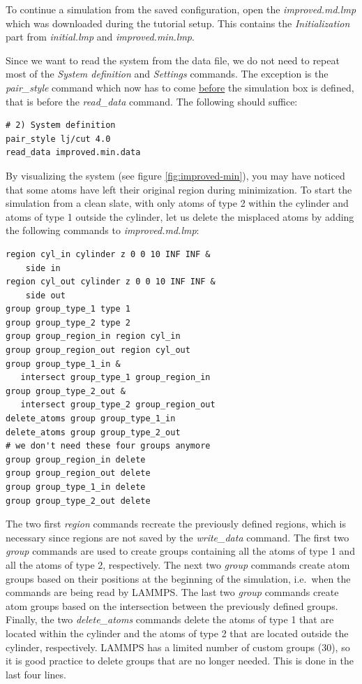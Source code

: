 \documentclass[9pt,tutorial]{livecoms}
\renewcommand{\emph}[1]{\underline{#1}}
\begin{document}
To continue a simulation from the saved configuration, open the
\textit{improved.md.lmp} which was downloaded during the tutorial setup.
This contains the \textit{Initialization} part from \textit{initial.lmp}
and \textit{improved.min.lmp}.

Since we want to read the system from the data file, we do not need
to repeat most of the \textit{System definition} and \textit{Settings}
commands.  The exception is the \textit{pair\_style} command which now
has to come \emph{before} the simulation box is defined, that is before
the \textit{read\_data} command.  The following should suffice:
\begin{lstlisting}
# 2) System definition
pair_style lj/cut 4.0
read_data improved.min.data
\end{lstlisting}

By visualizing the system (see figure \ref{fig:improved-min}), you may
have noticed that some atoms have left their original region during
minimization.  To start the simulation from a clean slate, with only
atoms of type 2 within the cylinder and atoms of type 1 outside the
cylinder, let us delete the misplaced atoms by adding the following
commands to \textit{improved.md.lmp}:

\begin{lstlisting}
region cyl_in cylinder z 0 0 10 INF INF &
    side in
region cyl_out cylinder z 0 0 10 INF INF &
    side out
group group_type_1 type 1
group group_type_2 type 2
group group_region_in region cyl_in
group group_region_out region cyl_out
group group_type_1_in &
   intersect group_type_1 group_region_in
group group_type_2_out &
   intersect group_type_2 group_region_out
delete_atoms group group_type_1_in
delete_atoms group group_type_2_out
# we don't need these four groups anymore
group group_region_in delete
group group_region_out delete
group group_type_1_in delete
group group_type_2_out delete
\end{lstlisting}

The two first \textit{region} commands recreate the previously defined
regions, which is necessary since regions are not saved by the
\textit{write\_data} command.  The first two \textit{group} commands are
used to create groups containing all the atoms of type 1 and all the
atoms of type 2, respectively.  The next two \textit{group} commands
create atom groups based on their positions at the beginning of the
simulation, i.e.~when the commands are being read by LAMMPS.  The last
two \textit{group} commands create atom groups based on the intersection
between the previously defined groups.  Finally, the two
\textit{delete\_atoms} commands delete the atoms of type 1 that are
located within the cylinder and the atoms of type 2 that are located
outside the cylinder, respectively.  LAMMPS has a limited number of
custom groups (30), so it is good practice to delete groups that are no
longer needed.  This is done in the last four lines.
\end{document}
